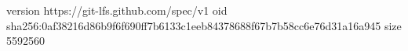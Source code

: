 version https://git-lfs.github.com/spec/v1
oid sha256:0af38216d86b9f6f690ff7b6133c1eeb84378688f67b7b58cc6e76d31a16a945
size 5592560
